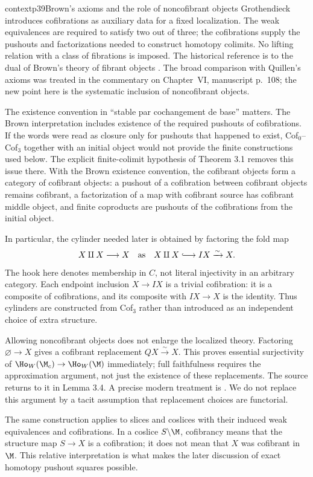 \begin{dcomment}{context}{p39}{Brown's axioms and the role of noncofibrant objects}
Grothendieck introduces cofibrations as auxiliary data for a fixed localization. The weak equivalences are required to satisfy two out of three; the cofibrations supply the pushouts and factorizations needed to construct homotopy colimits. No lifting relation with a class of fibrations is imposed. The historical reference is to the dual of Brown's theory of fibrant objects \citep{Brown1973}. The broad comparison with Quillen's axioms was treated in the commentary on Chapter~VI, manuscript p.~108; the new point here is the systematic inclusion of noncofibrant objects.

The existence convention in ``stable par cochangement de base'' matters. The Brown interpretation includes existence of the required pushouts of cofibrations. If the words were read as closure only for pushouts that happened to exist, Cof$_0$--Cof$_3$ together with an initial object would not provide the finite constructions used below. The explicit finite-colimit hypothesis of Theorem 3.1 removes this issue there. With the Brown existence convention, the cofibrant objects form a category of cofibrant objects: a pushout of a cofibration between cofibrant objects remains cofibrant, a factorization of a map with cofibrant source has cofibrant middle object, and finite coproducts are pushouts of the cofibrations from the initial object.

In particular, the cylinder needed later is obtained by factoring the fold map
\[
 X\amalg X\longrightarrow X
 \quad\hbox{as}\quad
 X\amalg X\lhook\joinrel\longrightarrow IX\xrightarrow{\sim}X.
\]
The hook here denotes membership in $C$, not literal injectivity in an arbitrary category. Each endpoint inclusion $X\to IX$ is a trivial cofibration: it is a composite of cofibrations, and its composite with $IX\to X$ is the identity. Thus cylinders are constructed from Cof$_3$ rather than introduced as an independent choice of extra structure.

Allowing noncofibrant objects does not enlarge the localized theory. Factoring $\varnothing\to X$ gives a cofibrant replacement $QX\xrightarrow{\sim}X$. This proves essential surjectivity of $\Ho_W(\M_c)\to\Ho_W(\M)$ immediately; full faithfulness requires the approximation argument, not just the existence of these replacements. The source returns to it in Lemma 3.4. A precise modern treatment is \citet[Theorem 6.1.6]{RadulescuBanu2009}. We do not replace this argument by a tacit assumption that replacement choices are functorial.

The same construction applies to slices and coslices with their induced weak equivalences and cofibrations. In a coslice $S\backslash\M$, cofibrancy means that the structure map $S\to X$ is a cofibration; it does not mean that $X$ was cofibrant in $\M$. This relative interpretation is what makes the later discussion of exact homotopy pushout squares possible.
\end{dcomment}

